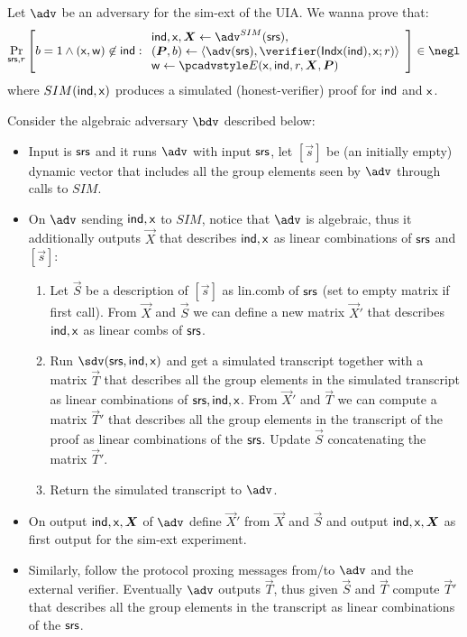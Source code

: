 \documentclass[runningheads,11pt]{llncs}
\begin{document}
Let $\adv$ be an adversary for the sim-ext of the UIA.
We wanna prove that:
\[
			\Prob[\srs,r]{
					b=1 \wedge (\inp,\wit)\not\in\ind:
					\begin{array}{l}
						\ind,\inp, \vec X \gets\adv^{SIM}(\srs),\\
					(\vec P,b) \gets \braket{\adv(\srs),\verifier(\Iphp(\ind),\inp;r)}\\
					\wit \gets \Ext(\inp,\ind,r,\vec X,\vec P)
					\end{array}
					}\in\negl
\]
where $SIM( {\mathsf{ind}},\mathsf{x} )$ produces a simulated (honest-verifier) proof for ${\mathsf{ind}}$ and $\mathsf{x}$.

Consider the algebraic adversary $\bdv$ described below:
\begin{itemize}
	\item Input is $\mathsf{srs}$ and it runs $\adv$ with input $\mathsf{srs}$, let $[\vec s]$ be (an
		initially empty)	dynamic vector that includes all the group elements seen by $\adv$ through calls to
		$SIM$.
	\item On $\adv$ sending ${\mathsf{ind}},\mathsf{x}$ to $SIM$, notice that $\adv$ is algebraic, thus it
		additionally outputs $\vec X$ that describes ${\mathsf{ind}},\mathsf{x}$ as linear combinations of
		$\mathsf{srs}$ and $[\vec s]$:
		\begin{enumerate}
			\item Let $\vec S$ be a description of $[\vec s]$ as lin.comb of $\mathsf{srs}$ (set to empty
				matrix if first call).
				From $\vec X$ and $\vec S$ we can define a new matrix $\vec X'$ that describes
				${\mathsf{ind}},\mathsf{x}$ as linear combs of $\mathsf{srs}$.
			\item Run $\sdv(\srs,\ind,\inp)$ and get a simulated transcript together with a matrix $\vec T$
				 that describes all the group elements in the simulated transcript as linear combinations of $\mathsf{srs},{\mathsf{ind}},\mathsf{x}$.
					From $\vec X'$ and $\vec T$ we can compute a matrix $\vec T'$ that describes all
					the group elements in the transcript of the proof as linear combinations of the
					$\mathsf{srs}$. Update $\vec S$ concatenating the matrix $\vec T'$.
			\item Return the simulated transcript to $\adv$.
		\end{enumerate}
	\item On output $\ind,\inp,\vec X$ of $\adv$ define $\vec X'$ from $\vec X$ and $\vec S$
		and output $\ind,\inp,\vec X$ as first output for the sim-ext experiment.
	\item Similarly, follow the protocol proxing messages from/to $\adv$ and the external verifier.
		Eventually $\adv$ outputs $\vec T$, thus given $\vec S$ and $\vec T$ compute $\vec T'$
		that describes all the group elements in the transcript as linear combinations of the
		$\mathsf{srs}$.
\end{itemize}
\end{document}
